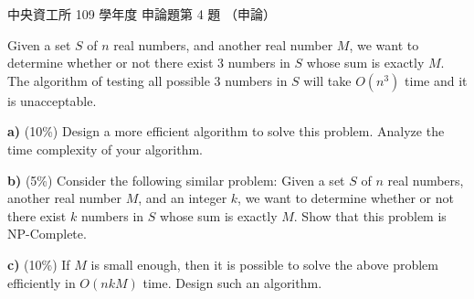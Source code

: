 \begin{pastexam}[label={px:ncu-109-dsa-15}]{中央資工所 109 學年度 申論題第 4 題}
（申論）

Given a set $S$ of $n$ real numbers, and another real number $M$, we want to determine whether or
not there exist 3 numbers in $S$ whose sum is exactly $M$. The algorithm of testing all possible 3
numbers in $S$ will take $O(n^3)$ time and it is unacceptable.

\textbf{a)} (10\%) Design a more efficient algorithm to solve this problem. Analyze the time
complexity of your algorithm.

\textbf{b)} (5\%) Consider the following similar problem: Given a set $S$ of $n$ real numbers,
another real number $M$, and an integer $k$, we want to determine whether or not there exist $k$
numbers in $S$ whose sum is exactly $M$. Show that this problem is NP-Complete.

\textbf{c)} (10\%) If $M$ is small enough, then it is possible to solve the above problem
efficiently in $O(nkM)$ time. Design such an algorithm.
\end{pastexam}

